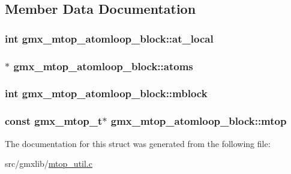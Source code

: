 \subsection{\-Member \-Data \-Documentation}
\hypertarget{structgmx__mtop__atomloop__block_ab9ff910791ddef2e62cb472210150831}{
\subsubsection[{at\-\_\-local}]{\setlength{\rightskip}{0pt plus 5cm}int {\bf gmx\-\_\-mtop\-\_\-atomloop\-\_\-block\-::at\-\_\-local}}}\label{structgmx__mtop__atomloop__block_ab9ff910791ddef2e62cb472210150831}
\hypertarget{structgmx__mtop__atomloop__block_a990d1977add90247a4c332339492fd5e}{
\subsubsection[{atoms}]{$\ast$ {\bf gmx\-\_\-mtop\-\_\-atomloop\-\_\-block\-::atoms}}}\label{structgmx__mtop__atomloop__block_a990d1977add90247a4c332339492fd5e}
\hypertarget{structgmx__mtop__atomloop__block_afc6f74d7410bd8b39c29ba0d0d7410a0}{
\subsubsection[{mblock}]{\setlength{\rightskip}{0pt plus 5cm}int {\bf gmx\-\_\-mtop\-\_\-atomloop\-\_\-block\-::mblock}}}\label{structgmx__mtop__atomloop__block_afc6f74d7410bd8b39c29ba0d0d7410a0}
\hypertarget{structgmx__mtop__atomloop__block_a0705987dcce275900bf3e7e506363d0c}{
\subsubsection[{mtop}]{\setlength{\rightskip}{0pt plus 5cm}const {\bf gmx\-\_\-mtop\-\_\-t}$\ast$ {\bf gmx\-\_\-mtop\-\_\-atomloop\-\_\-block\-::mtop}}}\label{structgmx__mtop__atomloop__block_a0705987dcce275900bf3e7e506363d0c}


\-The documentation for this struct was generated from the following file\-:\begin{DoxyCompactItemize}
\item 
src/gmxlib/\hyperlink{mtop__util_8c}{mtop\-\_\-util.\-c}\end{DoxyCompactItemize}
